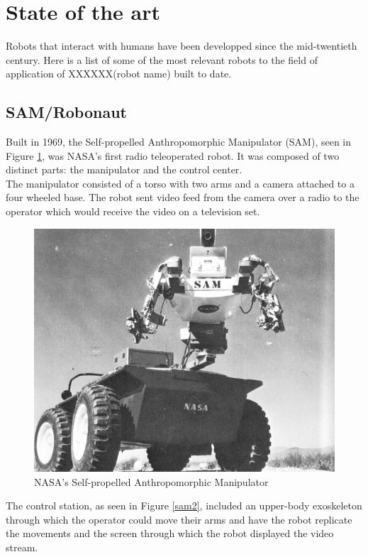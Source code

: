 \section{State of the art}

Robots that interact with humans have been developped since the mid-twentieth century. Here is a list of some of the most relevant robots to the field of application of XXXXXX(robot name) built to date. 


\subsection{SAM/Robonaut}
Built in 1969, the Self-propelled Anthropomorphic Manipulator (SAM), seen in Figure \ref{sam}, was NASA's first radio teleoperated robot. It was composed of two distinct parts: the manipulator and the control center.\\

The manipulator consisted of a torso with two arms and a camera attached to a four wheeled base. The robot sent video feed from the camera over a radio to the operator which would receive the video on a television set.\\

	\begin{figure}[H]
			\centering
			\includegraphics[scale=0.5]{images/StateOfArt/SAM.jpg}
			\caption{NASA's Self-propelled Anthropomorphic Manipulator }
			\label{sam}
	\end{figure}
	\bigskip

The control station, as seen in Figure \ref{sam2}, included an upper-body exoskeleton through which the operator could move their arms and have the robot replicate the movements and the screen through which the robot displayed the video stream.\\

